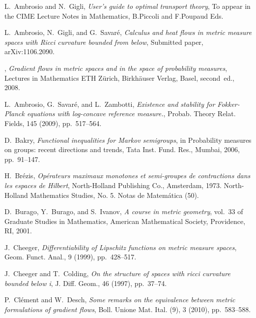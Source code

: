 \documentclass[reqno,11pt]{article}
\numberwithin{equation}{section}
\begin{document}
\def\cprime{$'$}
\begin{thebibliography}{10}

{\sc L.~Ambrosio and N.~Gigli}, {\em User's guide to optimal transport theory},
  To appear in the CIME Lecture Notes in Mathematics, B.Piccoli and F.Poupaud
  Eds.

{\sc L.~Ambrosio, N.~Gigli, and G.~Savar{\'e}}, {\em Calculus and heat flows in
  metric measure spaces with {R}icci curvature bounded from below}, Submitted
  paper, arXiv:1106.2090.

\leavevmode\vrule height 2pt depth -1.6pt width 23pt, {\em Gradient flows in
  metric spaces and in the space of probability measures}, Lectures in
  Mathematics ETH Z\"urich, Birkh\"auser Verlag, Basel, second~ed., 2008.

{\sc L.~Ambrosio, G.~Savar\'e, and L.~Zambotti}, {\em {Existence and stability
  for Fokker-Planck equations with log-concave reference measure.}}, Probab.
  Theory Relat. Fields, 145 (2009), pp.~517--564.

{\sc D.~Bakry}, {\em Functional inequalities for {M}arkov semigroups}, in
  Probability measures on groups: recent directions and trends, Tata Inst.
  Fund. Res., Mumbai, 2006, pp.~91--147.

{\sc H.~Br{\'e}zis}, {\em Op\'erateurs maximaux monotones et semi-groupes de
  contractions dans les espaces de {H}ilbert}, North-Holland Publishing Co.,
  Amsterdam, 1973.
\newblock North-Holland Mathematics Studies, No. 5. Notas de Matem\'atica (50).

{\sc D.~Burago, Y.~Burago, and S.~Ivanov}, {\em A course in metric geometry},
  vol.~33 of Graduate Studies in Mathematics, American Mathematical Society,
  Providence, RI, 2001.

{\sc J.~Cheeger}, {\em Differentiability of {L}ipschitz functions on metric
  measure spaces}, Geom. Funct. Anal., 9 (1999), pp.~428--517.

{\sc J.~Cheeger and T.~Colding}, {\em On the structure of spaces with ricci
  curvature bounded below i}, J. Diff. Geom., 46 (1997), pp.~37--74.

{\sc P.~Cl{\'e}ment and W.~Desch}, {\em Some remarks on the equivalence between
  metric formulations of gradient flows}, Boll. Unione Mat. Ital. (9), 3
  (2010), pp.~583--588.


\end{thebibliography}
\end{document}
